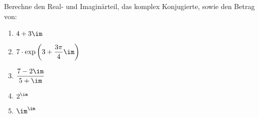 \begin{exercise}
  \label{ex:complex-calculations}
  Berechne den Real- und Imaginärteil, das komplex Konjugierte, sowie den Betrag
  von:
  \begin{enumerate}[label=(\alph*)]
  \item $4 + 3\im$
  \item $\displaystyle 7 \cdot \exp\left(3 + \frac{3 \pi}{4} \im\right)$
  \item $\displaystyle\frac{7 - 2\im}{5 + \im}$
  \item $2^\im$
  \item $\im^\im$
  \end{enumerate}
\end{exercise}
